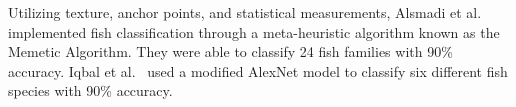 \documentclass[conference]{IEEEtran}
\begin{document}
Utilizing texture, anchor points, and statistical measurements,
Alsmadi et al.~\cite{Alsmadi2019RFE} implemented fish classification
through a meta-heuristic algorithm known as the Memetic Algorithm.
They were able to classify 24 fish families with 90\% accuracy.
Iqbal et al.~\cite{Iqbal2021AutomaticFS} used a
modified AlexNet \cite{AlexNet2012}
model to classify six different fish species with 90\% accuracy.
\end{document}
